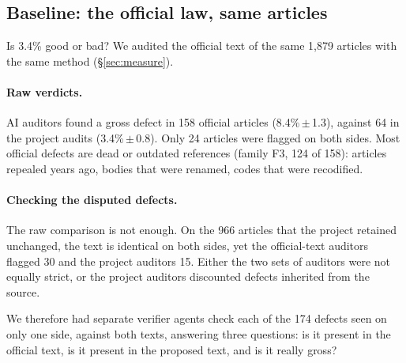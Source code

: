 \documentclass[11pt,a4paper]{article}
\begin{document}
\subsection{Baseline: the official law, same articles}
\label{sec:baseline}

Is 3.4\% good or bad? We audited the official text of the same 1{,}879 articles with the same method (\S\ref{sec:measure}).

\paragraph{Raw verdicts.}
AI auditors found a gross defect in 158 official articles (8.4\%\,$\pm$\,1.3), against 64 in the project audits (3.4\%\,$\pm$\,0.8). Only 24 articles were flagged on both sides. Most official defects are dead or outdated references (family F3, 124 of 158): articles repealed years ago, bodies that were renamed, codes that were recodified.

\paragraph{Checking the disputed defects.}
The raw comparison is not enough. On the 966 articles that the project retained unchanged, the text is identical on both sides, yet the official-text auditors flagged 30 and the project auditors 15. Either the two sets of auditors were not equally strict, or the project auditors discounted defects inherited from the source.

We therefore had separate verifier agents check each of the 174 defects seen on only one side, against both texts, answering three questions: is it present in the official text, is it present in the proposed text, and is it really gross?
\end{document}
